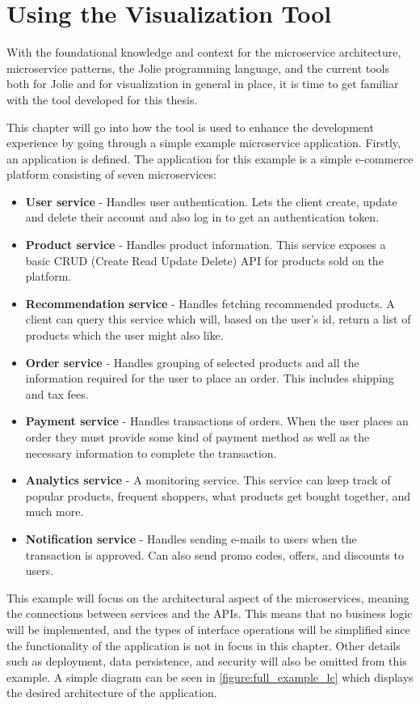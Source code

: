 \chapter{Using the Visualization Tool}
With the foundational knowledge and context for the microservice architecture, microservice patterns, the Jolie programming language, and the current tools both for Jolie and for visualization in general in place, it is time to get familiar with the tool developed for this thesis.

This chapter will go into how the tool is used to enhance the development experience by going through a simple example microservice application.
Firstly, an application is defined. The application for this example is a simple e-commerce platform consisting of seven microservices:

\begin{itemize}
    \item \textbf{User service} - Handles user authentication. Lets the client create, update and delete their account and also log in to get an authentication token.
    \item \textbf{Product service} - Handles product information. This service exposes a basic CRUD (Create Read Update Delete) API for products sold on the platform.
    \item \textbf{Recommendation service} - Handles fetching recommended products. A client can query this service which will, based on the user's id, return a list of products which the user might also like.
    \item \textbf{Order service} - Handles grouping of selected products and all the information required for the user to place an order. This includes shipping and tax fees.
    \item \textbf{Payment service} - Handles transactions of orders. When the user places an order they must provide some kind of payment method as well as the necessary information to complete the transaction.
    \item \textbf{Analytics service} - A monitoring service. This service can keep track of popular products, frequent shoppers, what products get bought together, and much more.
    \item \textbf{Notification service} - Handles sending e-mails to users when the transaction is approved. Can also send promo codes, offers, and discounts to users.
\end{itemize}
This example will focus on the architectural aspect of the microservices, meaning the connections between services and the APIs.
This means that no business logic will be implemented, and the types of interface operations will be simplified since the functionality of the application is not in focus in this chapter.
Other details such as deployment, data persistence, and security will also be omitted from this example. A simple diagram can be seen in \cref{figure:full_example_lc} which displays the desired architecture of the application.


